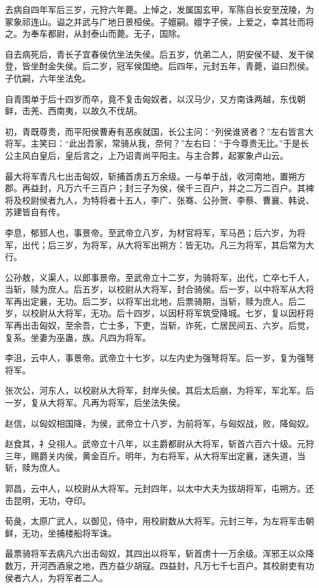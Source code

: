 \documentclass[]{article}
\begin{document}
去病自四年军后三岁，元狩六年薨。上悼之，发属国玄甲，军陈自长安至茂陵，为冢象祁连山。谥之并武与广地日景桓侯。子嬗嗣。嬗字子侯，上爱之，幸其壮而将之。为奉车都尉，从封泰山而薨。无子，国除。

自去病死后，青长子宜春侯伉坐法失侯。后五岁，伉弟二人，阴安侯不疑、发干侯登，皆坐酎金失侯。后二岁，冠军侯国绝。后四年，元封五年，青薨，谥曰烈侯。子伉嗣，六年坐法免。

自青围单于后十四岁而卒，竟不复击匈奴者，以汉马少，又方南诛两越，东伐朝鲜，击羌、西南夷，以故久不伐胡。

初，青既尊贵，而平阳侯曹寿有恶疾就国，长公主问：``列侯谁贤者？''左右皆言大将军。主笑曰：``此出吾家，常骑从我，奈何？''左右曰：``于今尊贵无比。''于是长公主风白皇后，皇后言之，上乃诏青尚平阳主。与主合葬，起冢象卢山云。

最大将军青凡七出击匈奴，斩捕首虏五万余级。一与单于战，收河南地，置朔方郡。再益封，凡万六千三百户；封三子为侯，侯千三百户，并之二万二百户。其裨将及校尉侯者九人，为特将者十五人，李广、张骞、公孙贺、李蔡、曹襄、韩说、苏建皆自有传。

李息，郁郅人也，事景帝。至武帝立八岁，为材官将军，军马邑；后六岁，为将军，出代；后三岁，为将军，从大将军出朔方：皆无功。凡三为将军，其后常为大行。

公孙敖，义渠人，以郎事景帝。至武帝立十二岁，为骑将军，出代，亡卒七千人，当斩，赎为庶人。后五岁，以校尉从大将军，封合骑侯。后一岁，以中将军从大将军再出定襄，无功。后二岁，以将军出北地，后票骑期，当斩，赎为庶人。后二岁，以校尉从大将军，无功。后十四岁，以因杅将军筑受降城。七岁，复以因杅将军再出击匈奴，至余吾，亡士多，下吏，当斩，诈死，亡居民间五、六岁。后觉，复系。坐妻为巫蛊，族。凡四为将军。

李沮，云中人，事景帝。武帝立十七岁，以左内史为强弩将军。后一岁，复为强弩将军。

张次公，河东人，以校尉从大将军，封岸头侯。其后太后崩，为将军，军北军。后一岁，复从大将军。凡再为将军，后坐法失侯。

赵信，以匈奴相国降，为侯，武帝立十八岁，为前将军，与匈奴战，败，降匈奴。

赵食其，礻殳祤人。武帝立十八年，以主爵都尉从大将军，斩首六百六十级。元狩三年，赐爵关内侯，黄金百斤。明年，为右将军，从大将军出定襄，迷失道，当斩，赎为庶人。

郭昌，云中人，以校尉从大将军。元封四年，以太中大夫为拔胡将军，屯朔方。还击昆明，无功，夺印。

荀彘，太原广武人，以御见，侍中，用校尉数从大将军。元封三年，为左将军击朝鲜，无功，坐捕楼船将军诛。

最票骑将军去病凡六出击匈奴，其四出以将军，斩首虏十一万余级。浑邪王以众降数万，开河西酒泉之地，西方益少胡寇。四益封，凡万七千七百户。其校尉吏有功侯者六人，为将军者二人。
\end{document}

